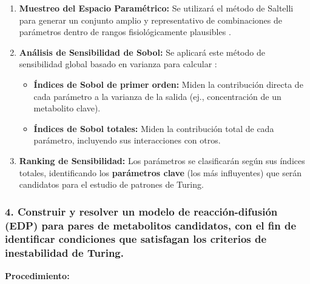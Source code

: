 \documentclass[12pt,spanish]{article}
\newcommand{\procedimiento}{\textbf{Procedimiento:}}
\begin{document}
	\begin{enumerate}
		\item \textbf{Muestreo del Espacio Paramétrico:} Se utilizará el método de Saltelli para generar un conjunto amplio y representativo de combinaciones de parámetros dentro de rangos fisiológicamente plausibles \cite{mckay1979}.
		
		\item \textbf{Análisis de Sensibilidad de Sobol:} Se aplicará este método de sensibilidad global basado en varianza para calcular \cite{sobol2001, saltelli2010}:
		\begin{itemize}
			\item \textbf{Índices de Sobol de primer orden:} Miden la contribución directa de cada parámetro a la varianza de la salida (ej., concentración de un metabolito clave).
			\item \textbf{Índices de Sobol totales:} Miden la contribución total de cada parámetro, incluyendo sus interacciones con otros.
		\end{itemize}
		
		\item \textbf{Ranking de Sensibilidad:} Los parámetros se clasificarán según sus índices totales, identificando los \textbf{parámetros clave} (los más influyentes) que serán candidatos para el estudio de patrones de Turing.
	\end{enumerate}
	
	\subsubsection*{4. Construir y resolver un modelo de reacción-difusión (EDP) para pares de metabolitos candidatos, con el fin de identificar condiciones que satisfagan los criterios de inestabilidad de Turing.}
	
	\procedimiento
	
\end{document}
